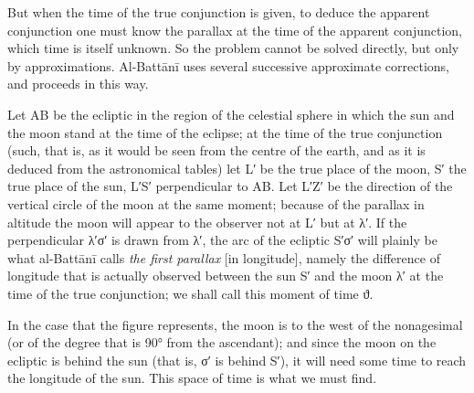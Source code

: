 \documentclass[11pt]{article}
\begin{document}
\par But when the time of the true conjunction is given, to deduce the apparent conjunction one must know the parallax at the time of the apparent conjunction, which time is itself unknown. So the problem cannot be solved directly, but only by approximations. Al-Battānī uses several successive approximate corrections, and proceeds in this way.\par
\begin{center}\end{center}
\par Let AB be the ecliptic in the region of the celestial sphere in which the sun and the moon stand at the time of the eclipse; at the time of the true conjunction (such, that is, as it would be seen from the centre of the earth, and as it is deduced from the astronomical tables) let L′ be the true place of the moon, S′ the true place of the sun, L′S′ perpendicular to AB. Let L′Z′ be the direction of the vertical circle of the moon at the same moment; because of the parallax in altitude the moon will appear to the observer not at L′ but at {\greekfont λ}′. If the perpendicular {\greekfont λ}′{\greekfont σ}′ is drawn from {\greekfont λ}′, the arc of the ecliptic S′{\greekfont σ}′ will plainly be what al-Battānī calls \emph{the first parallax} [in longitude], namely the difference of longitude that is actually observed between the sun S′ and the moon {\greekfont λ}′ at the time of the true conjunction; we shall call this moment of time {\greekfont ϑ}.\par
\par In the case that the figure represents, the moon is to the west of the nonagesimal (or of the degree that is 90° from the ascendant); and since the moon on the ecliptic is behind the sun (that is, {\greekfont σ}′ is behind S′), it will need some time to reach the longitude of the sun. This space of time is what we must find.\par
\end{document}
